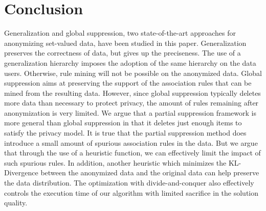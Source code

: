 \section{Conclusion}
\label{sec:conclude} Generalization and global suppression, two
state-of-the-art approaches for anonymizing set-valued data, have been
studied in this paper. Generalization preserves the correctness of data, but
gives up the preciseness. The use of a generalization hierarchy imposes the
adoption of the same hierarchy on the data users. Otherwise, rule mining will
not be possible on the anonymized data. Global suppression aims at preserving
the support of the association rules that can be mined from the resulting
data. However, since global suppression typically deletes more data than
necessary to protect privacy, the amount of rules remaining after
anonymization is very limited. We argue that a partial suppression framework
is more general than global suppression in that it deletes just enough items
to satisfy the privacy model.
It is true that the partial suppression method does introduce
a small amount of spurious association rules in the data.
But we argue that through the use of a heuristic function, we can
effectively limit the impact of such spurious rules. In addition,
another heuristic which minimizes the KL-Divergence between the
anonymized data and the original data can help preserve the
data distribution.
The optimization with divide-and-conquer also effectively
controls the execution time of our algorithm with limited sacrifice in
the solution quality.
